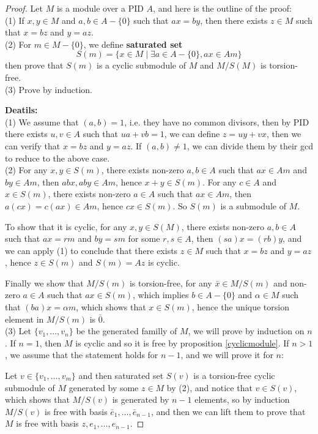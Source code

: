 \begin{proof}
        Let \(M\) is a module over a PID \(A\), and here is the outline of the proof:\\
        (1) If \(x,y \in M\) and \(a,b \in A -\{0\}\) such that \(ax=by\), then there exists \(z \in M\) such that \(x = bz\) and \(y = az\).\\
        (2) For \(m \in M- \{0\}\), we define \textbf{saturated set}
        \[S(m) = \{x \in M \mid \exists a \in A-\{0\},ax \in Am\}\]
        then prove that \(S(m)\) is a cyclic submodule of \(M\) and \(M/S(M)\) is torsion-free.\\
        (3) Prove by induction.

        \textbf{Deatils:}\\

        (1) We assume that \((a,b)=1\), i.e. they have no common divisors, then by PID there exists \(u,v \in A\) such that \(ua+vb=1\), we can define \(z = uy+vx\), then we can verify that \(x = bz\) and \(y = az\). If \((a,b) \neq 1\), we can divide them by their gcd to reduce to the above case.\\

        (2) For any \(x,y \in S(m)\), there exists non-zero \(a,b \in A\) such that \(ax \in Am\) and \(by \in Am\), then \(abx,aby \in Am\), hence \(x+y \in S(m)\). For any \(c \in A\) and \(x \in S(m)\), there exists non-zero \(a \in A\) such that \(ax \in Am\), then \(a(cx) = c(ax) \in Am\), hence \(cx \in S(m)\). So \(S(m)\) is a submodule of \(M\). 
        
        To show that it is cyclic, for any \(x,y \in S(M)\), there exists non-zero \(a,b \in A\) such that \(ax = rm\) and \(by = sm\) for some \(r,s \in A\), then \((sa)x = (rb)y\), and we can apply (1) to conclude that there exists \(z \in M\) such that \(x = bz\) and \(y = az\), hence \(z \in S(m)\) and \(S(m) = Az\) is cyclic. 
        
        Finally we show that \(M/S(m)\) is torsion-free, for any \(\bar{x} \in M/S(m)\) and non-zero \(a \in A\) such that \(ax \in S(m)\), which implies \(b \in A-\{0\}\) and \(\alpha \in M\) such that \((ba)x = \alpha m\), which shows that \(x \in S(m)\), hence the unique torsion element in \(M/S(m)\) is \(\bar{0}\).\\

        (3) Let \(\{v_1,...,v_n\}\) be the generated familly of \(M\), we will prove by induction on \(n\). If \(n=1\), then \(M\) is cyclic and so it is free by proposition \ref{cyclicmodule}. If \(n>1\), we assume that the statement holds for \(n-1\), and we will prove it for \(n\): 
        
        Let \(v \in \{v_1,\dots,v_m\}\) and then saturated set \(S(v)\) is a torsion-free cyclic submodule of \(M\) generated by some \(z \in M\) by (2), and notice that \(v \in S(v)\), which shows that \(M/S(v)\) is generated by \(n-1\) elements, so by induction \(M/S(v)\) is free with basis \(\bar{e}_1,\dots,\bar{e}_{n-1}\), and then we can lift them to prove that \(M\) is free with basis \(z,e_1,\dots,e_{n-1}\).
\end{proof}


